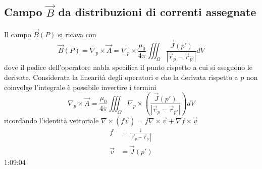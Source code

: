 \subsection{Campo $\vec{B}$ da distribuzioni di correnti assegnate}
Il campo $\vec{B}(P)$ si ricava con
$$
\vec{B}(P) = \nabla_p\times\vec{A} = \nabla_p \times \frac{\mu_0}{4\pi}\iiint_\Omega\frac{\vec{J}(p')}{|\vec{r}_p-\vec{r}_{p'}|}dV
$$
dove il pedice dell'operatore nabla specifica il punto rispetto a cui si eseguono le 
derivate.
Considerata la linearità degli operatori e che la derivata rispetto a $p$ non coinvolge
l'integrale è possibile invertire i termini
$$
\nabla_p\times\vec{A} = \frac{\mu_0}{4\pi}\iiint_\Omega \nabla_p\times\left(\frac{\vec{J}(p')}{|\vec{r}_p-\vec{r}_{p'}|}\right)dV
$$
ricordando l'identità vettoriale $\nabla\times(f\vec{v}) = f\nabla\times\vec{v} + \nabla f\times\vec{v}$  
\begin{align*}
f &= \frac{1}{|\vec{r}_p-\vec{r}_{p'}|} \\
\vec{v} &= \vec{J}(p')
\end{align*}
1:09:04


